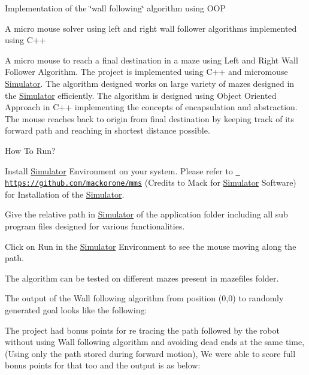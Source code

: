 Implementation of the \char`\"{}wall following\char`\"{} algorithm using O\+OP

A micro mouse solver using left and right wall follower algorithms implemented using C++

A micro mouse to reach a final destination in a maze using Left and Right Wall Follower Algorithm. The project is implemented using C++ and micromouse \mbox{\hyperlink{class_simulator}{Simulator}}. The algorithm designed works on large variety of mazes designed in the \mbox{\hyperlink{class_simulator}{Simulator}} efficiently. The algorithm is designed using Object Oriented Approach in C++ implementing the concepts of encapsulation and abstraction. The mouse reaches back to origin from final destination by keeping track of its forward path and reaching in shortest distance possible.

How To Run?
\begin{DoxyEnumerate}
\item Install \mbox{\hyperlink{class_simulator}{Simulator}} Environment on your system. Please refer to \href{https://github.com/mackorone/mms}{\texttt{ https\+://github.\+com/mackorone/mms}} (Credits to Mack for \mbox{\hyperlink{class_simulator}{Simulator}} Software) for Installation of the \mbox{\hyperlink{class_simulator}{Simulator}}.
\item Give the relative path in \mbox{\hyperlink{class_simulator}{Simulator}} of the application folder including all sub program files designed for various functionalities.
\item Click on Run in the \mbox{\hyperlink{class_simulator}{Simulator}} Environment to see the mouse moving along the path.
\item The algorithm can be tested on different mazes present in mazefiles folder.
\end{DoxyEnumerate}

The output of the Wall following algorithm from position (0,0) to randomly generated goal looks like the following\+:



The project had bonus points for re tracing the path followed by the robot without using Wall following algorithm and avoiding dead ends at the same time, (Using only the path stored during forward motion), We were able to score full bonus points for that too and the output is as below\+:

 